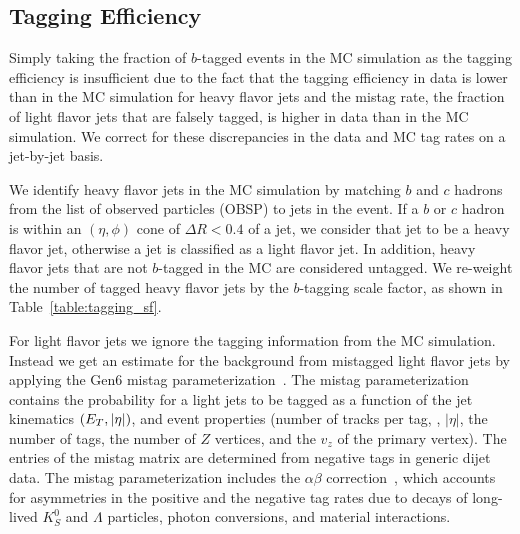 
\subsection{Tagging Efficiency}
\label{section:tageff}
Simply taking the fraction of $b$-tagged events in the MC simulation
as the tagging efficiency is insufficient due to the fact that the
tagging efficiency in data is lower than in the MC simulation for
heavy flavor jets and the mistag rate, \ie the fraction of
light flavor jets that are falsely tagged, is higher in data than in
the MC simulation. We correct for these discrepancies in the data and
MC tag rates on a jet-by-jet basis.

We identify heavy flavor jets in the MC simulation by matching $b$ and
$c$ hadrons from the list of observed particles (OBSP) to jets in the
event. If a $b$ or $c$ hadron is within an $(\eta,\phi)$ cone of
$\Delta R<0.4$ of a jet, we consider that jet to be a heavy flavor
jet, otherwise a jet is classified as a light flavor jet. In addition, 
heavy flavor jets that are not $b$-tagged in the MC are considered
untagged. We re-weight the number of tagged heavy flavor jets by the 
$b$-tagging scale factor, as shown in Table~\ref{table:tagging_sf}.

For light flavor jets we ignore the tagging information from the
MC simulation.  Instead we get an estimate for the background from
mistagged light flavor jets by applying the Gen6 mistag
parameterization~\cite{CDF7326,CDF8519}. The mistag parameterization contains the
probability for a light jets to be tagged as a function of the jet
kinematics $(E_{T}, |\eta|)$, and event properties (number of tracks per tag,
\et, $|\eta|$, the number of tags, the number of $Z$ vertices, and the 
$v_{z}$ of the primary vertex). The entries of the mistag matrix are determined
from negative tags in generic dijet data.  The mistag parameterization includes
the $\alpha\beta$ correction~\cite{CDF7585,CDF8626}, which accounts for
asymmetries in the positive and the negative tag rates due to decays
of long-lived $K^0_S$ and $\Lambda$ particles, photon conversions, and
material interactions. 

